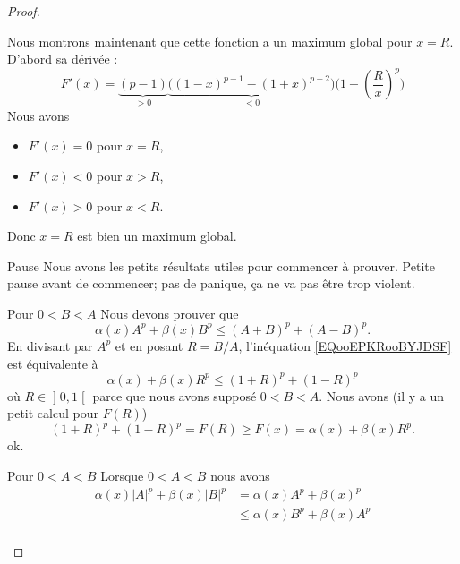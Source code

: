 \begin{proof}
\begin{subproof}
            Nous montrons maintenant que cette fonction a un maximum global pour \( x=R\). D'abord sa dérivée :
            \begin{equation}
                F'(x)=\underbrace{(p-1)}_{>0}\underbrace{\Big( (1-x)^{p-1}-(1+x)^{p-2} \Big)}_{<0}\Big( 1-\left( \frac{ R }{ x } \right)^p \Big)
            \end{equation}
            Nous avons
            \begin{itemize}
                \item \( F'(x)=0\) pour \( x=R\),
                \item \( F'(x)<0\) pour \( x>R\),
                \item \( F'(x)>0\) pour \( x<R\).
            \end{itemize}
            Donc \( x=R\) est bien un maximum global.
        \item[Pause]
            Nous avons les petits résultats utiles pour commencer à prouver. Petite pause avant de commencer; pas de panique, ça ne va pas être trop violent.
        \item[Pour \( 0<B<A\)]
            Nous devons prouver que
            \begin{equation}        \label{EQooEPKRooBYJDSF}
                \alpha(x)A^p+\beta(x)B^p\leq (A+B)^p+(A-B)^p.
            \end{equation}
            En divisant par \( A^p\) et en posant \( R=B/A\), l'inéquation \eqref{EQooEPKRooBYJDSF} est équivalente à
            \begin{equation}
                \alpha(x)+\beta(x)R^p\leq (1+R)^p+(1-R)^p
            \end{equation}
            où \( R\in \mathopen] 0 , 1 \mathclose[\) parce que nous avons supposé \( 0<B<A\). Nous avons (il y a un petit calcul pour \( F(R)\))
            \begin{equation}
                (1+R)^p+(1-R)^p=F(R)\geq F(x)=\alpha(x)+\beta(x)R^p.
            \end{equation}
            ok.
        \item[Pour \( 0<A<B\)]
            Lorsque \( 0<A<B\) nous avons 
            \begin{subequations}
                \begin{align}
                    \alpha(x)| A |^p+\beta(x)| B |^p&=\alpha(x)A^p+\beta(x)^p\\
                    &\leq \alpha(x)B^p+\beta(x)A^p      \label{SUBEQooSHNUooCoWMFB}\\

\end{align}
\end{subequations}
\end{subproof}
\end{proof}
